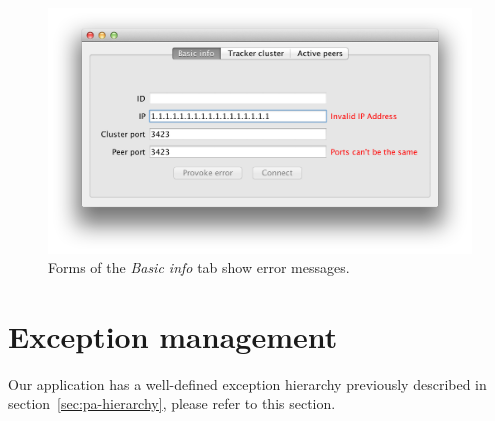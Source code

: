 \documentclass[twoside,a4paper,10pt]{article}
\begin{document}
\begin{figure}[h]
  \centering
  \includegraphics[width=\textwidth]{imgs/form_validation.png}
  \caption{\label{fig:validation}Forms of the \emph{Basic info} tab show
    error messages.}
\end{figure}


\section{Exception management}

Our application has a well-defined exception hierarchy previously described
in section~\ref{sec:pa-hierarchy}, please refer to this section.

%
%
\end{document}

